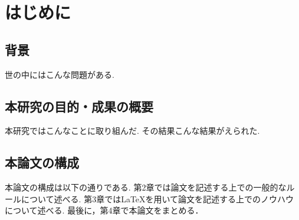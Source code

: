 \chapter{はじめに}



\section{背景}
世の中にはこんな問題がある. 

\section{本研究の目的・成果の概要}
本研究ではこんなことに取り組んだ. その結果こんな結果がえられた. 

\section{本論文の構成}
本論文の構成は以下の通りである. 
第2章では論文を記述する上での一般的なルールについて述べる. 
第3章では\LaTeX を用いて論文を記述する上でのノウハウについて述べる. 
最後に，第4章で本論文をまとめる．
